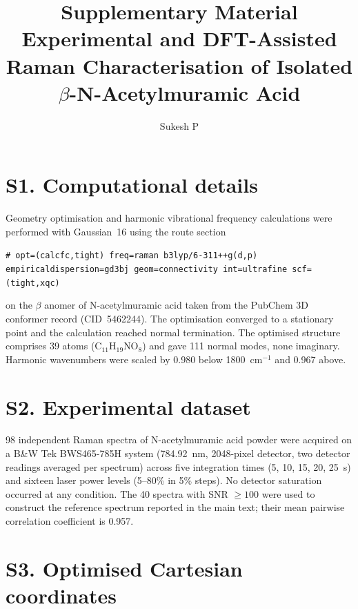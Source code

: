 \documentclass[11pt,a4paper]{article}
\title{\vspace{-2em}Supplementary Material\\[4pt]
\large Experimental and DFT-Assisted Raman Characterisation of Isolated
$\beta$-N-Acetylmuramic Acid}
\author{Sukesh P}
\date{}
\newcommand{\wn}{\ensuremath{\mathrm{cm}^{-1}}}
\begin{document}
\maketitle

\section*{S1. Computational details}

Geometry optimisation and harmonic vibrational frequency calculations were
performed with Gaussian~16 using the route section

\begin{center}
\texttt{\# opt=(calcfc,tight) freq=raman b3lyp/6-311++g(d,p)}\\
\texttt{empiricaldispersion=gd3bj geom=connectivity int=ultrafine scf=(tight,xqc)}
\end{center}

\noindent
on the $\beta$ anomer of N-acetylmuramic acid taken from the PubChem 3D
conformer record (CID~5462244). The optimisation converged to a stationary point and the calculation reached normal termination.
The optimised structure comprises 39 atoms (C$_{11}$H$_{19}$NO$_8$) and gave
111 normal modes, none imaginary. Harmonic wavenumbers were scaled by 0.980
below 1800~\wn{} and 0.967 above.

\section*{S2. Experimental dataset}

98 independent Raman spectra of N-acetylmuramic acid powder were acquired on a
B\&W Tek BWS465-785H system (784.92~nm, 2048-pixel detector, two detector
readings averaged per spectrum) across five integration times (5, 10, 15, 20,
25~s) and sixteen laser power levels (5--80\% in 5\% steps). No detector
saturation occurred at any condition. The 40 spectra with SNR $\geq 100$ were
used to construct the reference spectrum reported in the main text; their mean
pairwise correlation coefficient is 0.957.

\section*{S3. Optimised Cartesian coordinates}
\end{document}
